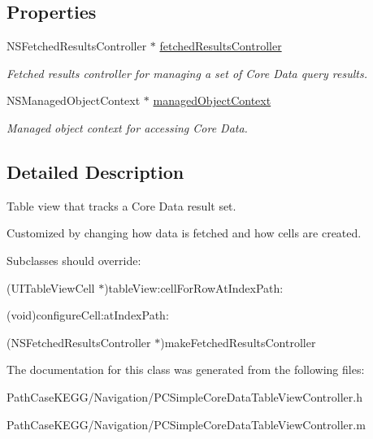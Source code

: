 \subsection*{Properties}
\begin{DoxyCompactItemize}
\item 
\hypertarget{interface_p_c_simple_core_data_table_view_controller_aecae1aeb2d9c2b4f7396b7094e806ed3}{
NSFetchedResultsController $\ast$ \hyperlink{interface_p_c_simple_core_data_table_view_controller_aecae1aeb2d9c2b4f7396b7094e806ed3}{fetchedResultsController}}
\label{interface_p_c_simple_core_data_table_view_controller_aecae1aeb2d9c2b4f7396b7094e806ed3}

\begin{DoxyCompactList}\small\item\em Fetched results controller for managing a set of Core Data query results. \end{DoxyCompactList}\item 
\hypertarget{interface_p_c_simple_core_data_table_view_controller_a60a2acf690c457bca7fc522a49195303}{
NSManagedObjectContext $\ast$ \hyperlink{interface_p_c_simple_core_data_table_view_controller_a60a2acf690c457bca7fc522a49195303}{managedObjectContext}}
\label{interface_p_c_simple_core_data_table_view_controller_a60a2acf690c457bca7fc522a49195303}

\begin{DoxyCompactList}\small\item\em Managed object context for accessing Core Data. \end{DoxyCompactList}\end{DoxyCompactItemize}


\subsection{Detailed Description}
Table view that tracks a Core Data result set. 

Customized by changing how data is fetched and how cells are created.

Subclasses should override:
\begin{DoxyItemize}
\item {\ttfamily }(UITableViewCell $\ast$)tableView:cellForRowAtIndexPath:
\item {\ttfamily }(void)configureCell:atIndexPath:
\item {\ttfamily }(NSFetchedResultsController $\ast$)makeFetchedResultsController 
\end{DoxyItemize}

The documentation for this class was generated from the following files:\begin{DoxyCompactItemize}
\item 
PathCaseKEGG/Navigation/PCSimpleCoreDataTableViewController.h\item 
PathCaseKEGG/Navigation/PCSimpleCoreDataTableViewController.m\end{DoxyCompactItemize}
